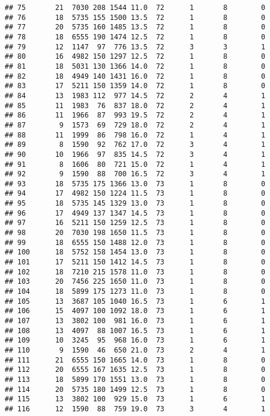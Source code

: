 \documentclass{article}\usepackage[]{graphicx}\usepackage[]{color}
\makeatletter
\newenvironment{kframe}{%
 \def\at@end@of@kframe{}%
 \ifinner\ifhmode%
  \def\at@end@of@kframe{\end{minipage}}%
  \begin{minipage}{\columnwidth}%
 \fi\fi%
 \def\FrameCommand##1{\hskip\@totalleftmargin \hskip-\fboxsep
 \colorbox{shadecolor}{##1}\hskip-\fboxsep
     \hskip-\linewidth \hskip-\@totalleftmargin \hskip\columnwidth}%
 \MakeFramed {\advance\hsize-\width
   \@totalleftmargin\z@ \linewidth\hsize
   \@setminipage}}%
 {\par\unskip\endMakeFramed%
 \at@end@of@kframe}
\newenvironment{knitrout}{}{} %
\makeatother
\begin{document}
\begin{knitrout}
\begin{kframe}
\begin{verbatim}
## 75       21  7030 208 1544 11.0  72      1       8        0
## 76       18  5735 155 1500 13.5  72      1       8        0
## 77       20  5735 160 1485 13.5  72      1       8        0
## 78       18  6555 190 1474 12.5  72      1       8        0
## 79       12  1147  97  776 13.5  72      3       3        1
## 80       16  4982 150 1297 12.5  72      1       8        0
## 81       18  5031 130 1366 14.0  72      1       8        0
## 82       18  4949 140 1431 16.0  72      1       8        0
## 83       17  5211 150 1359 14.0  72      1       8        0
## 84       13  1983 112  977 14.5  72      2       4        1
## 85       11  1983  76  837 18.0  72      2       4        1
## 86       11  1966  87  993 19.5  72      2       4        1
## 87        9  1573  69  729 18.0  72      2       4        1
## 88       11  1999  86  798 16.0  72      1       4        1
## 89        8  1590  92  762 17.0  72      3       4        1
## 90       10  1966  97  835 14.5  72      3       4        1
## 91        8  1606  80  721 15.0  72      1       4        1
## 92        9  1590  88  700 16.5  72      3       4        1
## 93       18  5735 175 1366 13.0  73      1       8        0
## 94       17  4982 150 1224 11.5  73      1       8        0
## 95       18  5735 145 1329 13.0  73      1       8        0
## 96       17  4949 137 1347 14.5  73      1       8        0
## 97       16  5211 150 1259 12.5  73      1       8        0
## 98       20  7030 198 1650 11.5  73      1       8        0
## 99       18  6555 150 1488 12.0  73      1       8        0
## 100      18  5752 158 1454 13.0  73      1       8        0
## 101      17  5211 150 1412 14.5  73      1       8        0
## 102      18  7210 215 1578 11.0  73      1       8        0
## 103      20  7456 225 1650 11.0  73      1       8        0
## 104      18  5899 175 1273 11.0  73      1       8        0
## 105      13  3687 105 1040 16.5  73      1       6        1
## 106      15  4097 100 1092 18.0  73      1       6        1
## 107      13  3802 100  981 16.0  73      1       6        1
## 108      13  4097  88 1007 16.5  73      1       6        1
## 109      10  3245  95  968 16.0  73      1       6        1
## 110       9  1590  46  650 21.0  73      2       4        1
## 111      21  6555 150 1665 14.0  73      1       8        0
## 112      20  6555 167 1635 12.5  73      1       8        0
## 113      18  5899 170 1551 13.0  73      1       8        0
## 114      20  5735 180 1499 12.5  73      1       8        0
## 115      13  3802 100  929 15.0  73      1       6        1
## 116      12  1590  88  759 19.0  73      3       4        1

\end{verbatim}
\end{kframe}
\end{knitrout}
\end{document}

